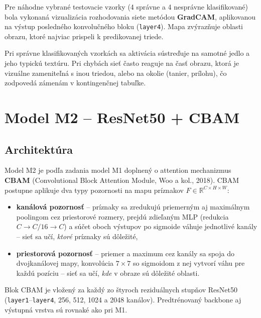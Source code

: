 Pre náhodne vybrané testovacie vzorky (4 správne a 4 nesprávne
klasifikované) bola vykonaná vizualizácia rozhodovania siete metódou
\textbf{GradCAM}, aplikovanou na výstup posledného konvolučného bloku
(\texttt{layer4}). Mapa zvýrazňuje oblasti obrazu, ktoré najviac prispeli
k predikovanej triede.


Pri správne klasifikovaných vzorkách sa aktivácia sústreďuje na samotné
jedlo a jeho typickú textúru. Pri chybách sieť často reaguje na časť obrazu,
ktorá je vizuálne zameniteľná s inou triedou, alebo na okolie (tanier,
prílohu), čo zodpovedá zámenám v kontingenčnej tabuľke.

\section{Model M2 -- ResNet50 + CBAM}
\label{sec:m2}

\subsection{Architektúra}

Model M2 je podľa zadania model M1 doplnený o attention mechanizmus
\textbf{CBAM} (Convolutional Block Attention Module, Woo a kol., 2018).
CBAM postupne aplikuje dva typy pozornosti na mapu príznakov
$F \in \mathbb{R}^{C \times H \times W}$:

\begin{itemize}
    \item \textbf{kanálová pozornosť} -- príznaky sa zredukujú priemerným
          aj maximálnym poolingom cez priestorové rozmery, prejdú zdieľaným
          MLP (redukcia $C \rightarrow C/16 \rightarrow C$) a súčet oboch
          výstupov po sigmoide váhuje jednotlivé kanály -- sieť sa učí,
          \emph{ktoré} príznaky sú dôležité,
    \item \textbf{priestorová pozornosť} -- priemer a maximum cez kanály
          sa spoja do dvojkanálovej mapy, konvolúcia $7\times7$ so sigmoidom
          z nej vytvorí váhu pre každú pozíciu -- sieť sa učí, \emph{kde}
          v obraze sú dôležité oblasti.
\end{itemize}

\noindent Blok CBAM je vložený za každý zo štyroch reziduálnych stupňov
ResNet50 (\texttt{layer1}--\texttt{layer4}, 256, 512, 1024 a 2048 kanálov).
Predtrénovaný backbone aj výstupná vrstva sú rovnaké ako pri M1.

